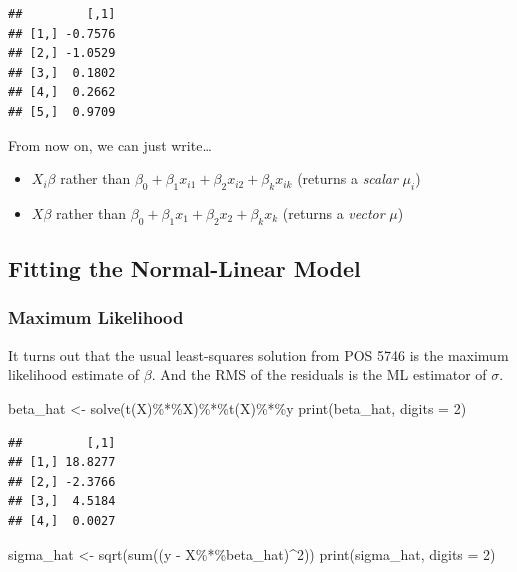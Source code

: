 \documentclass[
]{book}
\newenvironment{Shaded}{\begin{snugshade}}{\end{snugshade}}
\newcommand{\AttributeTok}[1]{\textcolor[rgb]{0.77,0.63,0.00}{#1}}
\newcommand{\DecValTok}[1]{\textcolor[rgb]{0.00,0.00,0.81}{#1}}
\newcommand{\FunctionTok}[1]{\textcolor[rgb]{0.00,0.00,0.00}{#1}}
\newcommand{\NormalTok}[1]{#1}
\newcommand{\OtherTok}[1]{\textcolor[rgb]{0.56,0.35,0.01}{#1}}
\newcommand{\SpecialCharTok}[1]{\textcolor[rgb]{0.00,0.00,0.00}{#1}}
\providecommand{\tightlist}{%
  \setlength{\itemsep}{0pt}\setlength{\parskip}{0pt}}
\begin{document}
\begin{verbatim}
##         [,1]
## [1,] -0.7576
## [2,] -1.0529
## [3,]  0.1802
## [4,]  0.2662
## [5,]  0.9709
\end{verbatim}

From now on, we can just write\ldots{}

\begin{itemize}
\tightlist
\item
  \(X_i\beta\) rather than \(\beta_0 + \beta_1 x_{i1} + \beta_2 x_{i2} + \beta_k x_{ik}\) (returns a \emph{scalar} \(\mu_i\))
\item
  \(X\beta\) rather than \(\beta_0 + \beta_1 x_{1} + \beta_2 x_{2} + \beta_k x_{k}\) (returns a \emph{vector} \(\mu\))
\end{itemize}

\hypertarget{fitting-the-normal-linear-model}{%
\subsection{Fitting the Normal-Linear Model}\label{fitting-the-normal-linear-model}}

\hypertarget{maximum-likelihood-1}{%
\subsubsection{Maximum Likelihood}\label{maximum-likelihood-1}}

It turns out that the usual least-squares solution from POS 5746 is the maximum likelihood estimate of \(\beta\). And the RMS of the residuals is the ML estimator of \(\sigma\).

\begin{Shaded}
\begin{Highlighting}[]
\NormalTok{beta\_hat }\OtherTok{\textless{}{-}} \FunctionTok{solve}\NormalTok{(}\FunctionTok{t}\NormalTok{(X)}\SpecialCharTok{\%*\%}\NormalTok{X)}\SpecialCharTok{\%*\%}\FunctionTok{t}\NormalTok{(X)}\SpecialCharTok{\%*\%}\NormalTok{y}
\FunctionTok{print}\NormalTok{(beta\_hat, }\AttributeTok{digits =} \DecValTok{2}\NormalTok{)}
\end{Highlighting}
\end{Shaded}

\begin{verbatim}
##         [,1]
## [1,] 18.8277
## [2,] -2.3766
## [3,]  4.5184
## [4,]  0.0027
\end{verbatim}

\begin{Shaded}
\begin{Highlighting}[]
\NormalTok{sigma\_hat }\OtherTok{\textless{}{-}} \FunctionTok{sqrt}\NormalTok{(}\FunctionTok{sum}\NormalTok{((y }\SpecialCharTok{{-}}\NormalTok{ X}\SpecialCharTok{\%*\%}\NormalTok{beta\_hat)}\SpecialCharTok{\^{}}\DecValTok{2}\NormalTok{))}
\FunctionTok{print}\NormalTok{(sigma\_hat, }\AttributeTok{digits =} \DecValTok{2}\NormalTok{)}
\end{Highlighting}
\end{Shaded}
\end{document}
